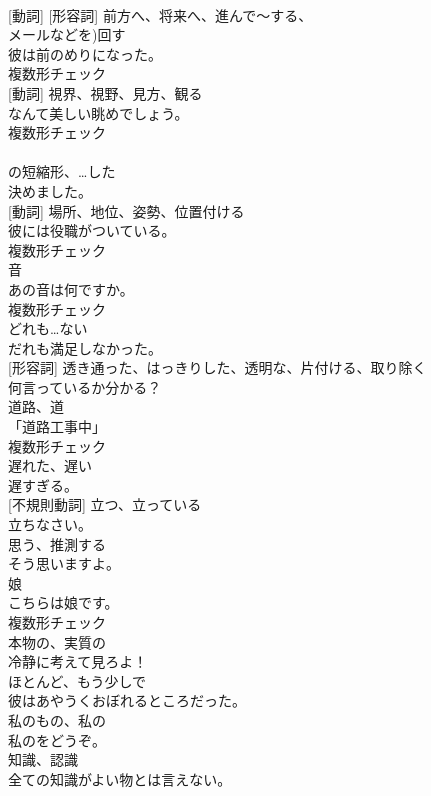 \documentclass[8pt]{extreport}
\begin{document}
\begin{CJK}{UTF8}{min}
\\	[名詞] [動詞] [形容詞]	前方へ、将来へ、進んで〜する、
\\	メールなどを)回す	
\\	彼は前のめりになった。	
\\	複数形チェック
\\	[名詞] [動詞]	視界、視野、見方、観る	
\\	なんて美しい眺めでしょう。	
\\	複数形チェック
\\	[短縮形]	
\\	の短縮形、…した	
\\	決めました。	
\\	[名詞] [動詞]	場所、地位、姿勢、位置付ける	
\\	彼には役職がついている。	
\\	複数形チェック
\\	[名詞]	音	
\\	あの音は何ですか。	
\\	複数形チェック
\\	[代名詞]	どれも…ない	
\\	だれも満足しなかった。	
\\	[動詞] [形容詞]	透き通った、はっきりした、透明な、片付ける、取り除く	
\\	何言っているか分かる？	
\\	[名詞]	道路、道	
\\	「道路工事中」	
\\	複数形チェック
\\	[形容詞]	遅れた、遅い	
\\	遅すぎる。	
\\	[動詞] [不規則動詞]	立つ、立っている	
\\	立ちなさい。	
\\	[動詞]	思う、推測する	
\\	そう思いますよ。	
\\	[名詞]	娘	
\\	こちらは娘です。	
\\	複数形チェック
\\	[形容詞]	本物の、実質の	
\\	冷静に考えて見ろよ！	
\\	[副詞]	ほとんど、もう少しで	
\\	彼はあやうくおぼれるところだった。	
\\	[代名詞]	私のもの、私の	
\\	私のをどうぞ。	
\\	[名詞]	知識、認識	
\\	全ての知識がよい物とは言えない。	

\end{CJK}
\end{document}
